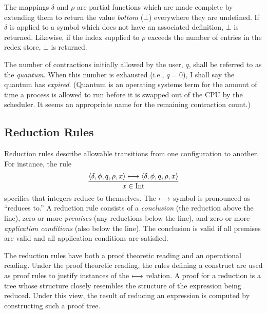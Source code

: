 The mappings \(\delta\) and \(\rho\) are partial functions which are made
complete by extending them to return the value \emph{bottom} (\(\bot\)) everywhere they
are undefined. If \(\delta\) is applied to a symbol which does not have an
associated definition, \(\bot\) is returned. Likewise, if the index supplied to
\(\rho\) exceeds the number of entries in the redex store, \(\bot\) is returned.

The number of contractions initially allowed by the user, \(q\), shall be
referred to as the \emph{quantum}. When this number is exhausted (i.e., \(q=0\)), I
shall say the quantum has \emph{expired}. (Quantum is an operating systems term
for the amount of time a process is allowed to run before it is swapped out of
the CPU by the scheduler. It seems an appropriate name for the remaining
contraction count.)

\subsection{Reduction Rules}

Reduction rules describe allowable transitions from one configuration to
another. For instance, the rule
\[
\frac{\langle \delta,\phi,q,\rho,x\rangle\longmapsto
      \langle \delta,\phi,q,\rho,x\rangle}
     {x\in \operatorname{Int}}
\]
specifies that integers reduce to themselves. The \(\longmapsto\) symbol is
pronounced as ``reduces to.'' A reduction rule consists of a \emph{conclusion} (the
reduction above the line), zero or more \emph{premises} (any reductions below the
line), and zero or more \emph{application conditions} (also below the line). The
conclusion is valid if all premises are valid and all application conditions are
satisfied.

The reduction rules have both a proof theoretic reading and an operational
reading. Under the proof theoretic reading, the rules defining a construct are
used as proof rules to justify instances of the \(\longmapsto\) relation. A proof
for a reduction is a tree whose structure closely resembles the structure of the
expression being reduced. Under this view, the result of reducing an expression
is computed by constructing such a proof tree.

